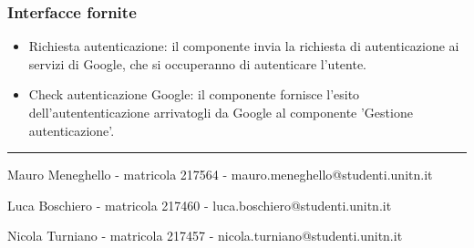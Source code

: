 \documentclass[a4paper,12pt]{article}
\begin{document}
\subsubsection*{Interfacce fornite}
\begin{itemize} \setlength\itemsep{0.01em}
\item {\sffamily Richiesta autenticazione}: il componente invia la richiesta di autenticazione ai servizi di Google, che si occuperanno di autenticare l'utente.
\item {\sffamily Check autenticazione Google}: il componente fornisce l'esito dell'autententicazione arrivatogli da Google al componente 'Gestione autenticazione'.
\end{itemize}









\vspace{15cm}
\hrule
\vspace{0.5cm}


Mauro Meneghello - matricola 217564 - mauro.meneghello@studenti.unitn.it

Luca Boschiero - matricola 217460 -  luca.boschiero@studenti.unitn.it

Nicola Turniano - matricola 217457 - nicola.turniano@studenti.unitn.it

 
\end{document}

